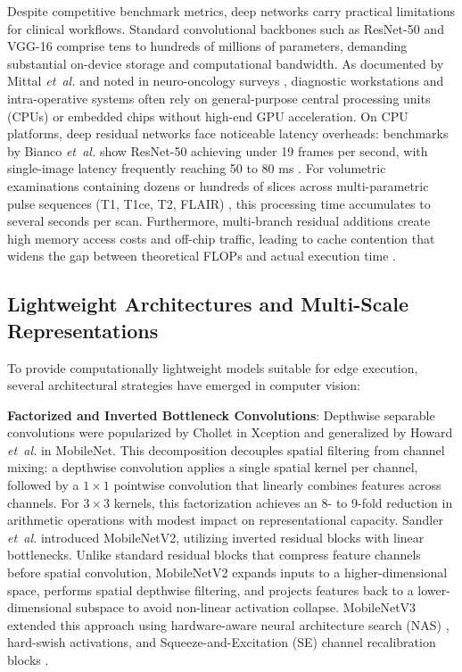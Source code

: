 Despite competitive benchmark metrics, deep networks carry practical limitations for clinical workflows. Standard convolutional backbones such as ResNet-50 \cite{10} and VGG-16 \cite{29} comprise tens to hundreds of millions of parameters, demanding substantial on-device storage and computational bandwidth. As documented by Mittal \emph{et~al.} \cite{25} and noted in neuro-oncology surveys \cite{40}, diagnostic workstations and intra-operative systems often rely on general-purpose central processing units (CPUs) or embedded chips without high-end GPU acceleration. On CPU platforms, deep residual networks face noticeable latency overheads: benchmarks by Bianco \emph{et~al.} \cite{43} show ResNet-50 achieving under 19 frames per second, with single-image latency frequently reaching 50 to 80 ms \cite{25, 44}. For volumetric examinations containing dozens or hundreds of slices across multi-parametric pulse sequences (T1, T1ce, T2, FLAIR) \cite{2, 23, 45}, this processing time accumulates to several seconds per scan. Furthermore, multi-branch residual additions create high memory access costs and off-chip traffic, leading to cache contention that widens the gap between theoretical FLOPs and actual execution time \cite{25}.

\subsection{Lightweight Architectures and Multi-Scale Representations}
To provide computationally lightweight models suitable for edge execution, several architectural strategies have emerged in computer vision:

\noindent\textbf{Factorized and Inverted Bottleneck Convolutions}: Depthwise separable convolutions were popularized by Chollet \cite{13} in Xception and generalized by Howard \emph{et~al.} \cite{11} in MobileNet. This decomposition decouples spatial filtering from channel mixing: a depthwise convolution applies a single spatial kernel per channel, followed by a $1\times1$ pointwise convolution that linearly combines features across channels. For $3\times3$ kernels, this factorization achieves an 8- to 9-fold reduction in arithmetic operations with modest impact on representational capacity. Sandler \emph{et~al.} \cite{27} introduced MobileNetV2, utilizing inverted residual blocks with linear bottlenecks. Unlike standard residual blocks that compress feature channels before spatial convolution, MobileNetV2 expands inputs to a higher-dimensional space, performs spatial depthwise filtering, and projects features back to a lower-dimensional subspace to avoid non-linear activation collapse. MobileNetV3 \cite{14} extended this approach using hardware-aware neural architecture search (NAS) \cite{36}, hard-swish activations, and Squeeze-and-Excitation (SE) channel recalibration blocks \cite{12}.

